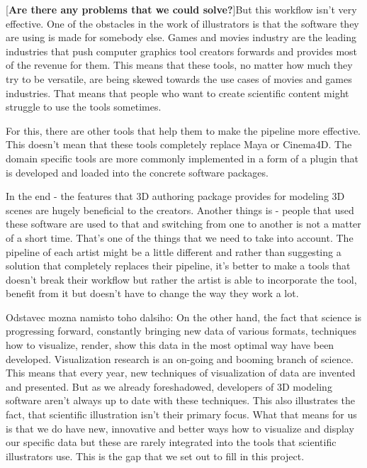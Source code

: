 \documentclass[
  digital, %
  table,   %
  nolof,     %
  nolot,     %
]{fithesis3}
\begin{document}
[\textbf{Are there any problems that we could solve?}]But this workflow isn't very effective. One of the obstacles in the work of illustrators is that the software they are using is made for somebody else. Games and movies industry are the leading industries that push computer graphics tool creators forwards and provides most of the revenue for them. This means that these tools, no matter how much they try to be versatile, are being skewed towards the use cases of movies and games industries. That means that people who want to create scientific content might struggle to use the tools sometimes.

For this, there are other tools that help them to make the pipeline more effective. This doesn't mean that these tools completely replace Maya or Cinema4D. The domain specific tools are more commonly implemented in a form of a plugin that is developed and loaded into the concrete software packages.

In the end - the features that 3D authoring package provides for modeling 3D scenes are hugely beneficial to the creators. Another things is - people that used these software are used to that and switching from one to another is not a matter of a short time. That's one of the things that we need to take into account. The pipeline of each artist might be a little different and rather than suggesting a solution that completely replaces their pipeline, it's better to make a tools that doesn't break their workflow but rather the artist is able to incorporate the tool, benefit from it but doesn't have to change the way they work a lot.

Odstavec mozna namisto toho dalsiho: On the other hand, the fact that science is progressing forward, constantly bringing new data of various formats, techniques how to visualize, render, show this data in the most optimal way have been developed. Visualization research is an on-going and booming branch of science. This means that every year, new techniques of visualization of data are invented and presented. But as we already foreshadowed, developers of 3D modeling software aren't always up to date with these techniques. This also illustrates the fact, that scientific illustration isn't their primary focus. What that means for us is that we do have new, innovative and better ways how to visualize and display our specific data but these are rarely integrated into the tools that scientific illustrators use. This is the gap that we set out to fill in this project.
\end{document}
